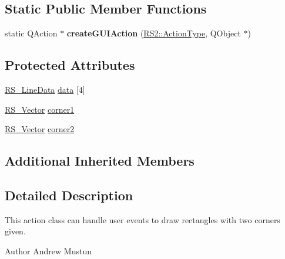 \subsection*{Static Public Member Functions}
\begin{DoxyCompactItemize}
\item 
\hypertarget{classRS__ActionDrawLineRectangle_a43f47faa3d48f2249db20c22d4e6551b}{static Q\-Action $\ast$ {\bfseries create\-G\-U\-I\-Action} (\hyperlink{classRS2_afe3523e0bc41fd637b892321cfc4b9d7}{R\-S2\-::\-Action\-Type}, Q\-Object $\ast$)}\label{classRS__ActionDrawLineRectangle_a43f47faa3d48f2249db20c22d4e6551b}

\end{DoxyCompactItemize}
\subsection*{Protected Attributes}
\begin{DoxyCompactItemize}
\item 
\hyperlink{classRS__LineData}{R\-S\-\_\-\-Line\-Data} \hyperlink{classRS__ActionDrawLineRectangle_a723761bc55877717efebafbc7969aff9}{data} \mbox{[}4\mbox{]}
\item 
\hyperlink{classRS__Vector}{R\-S\-\_\-\-Vector} \hyperlink{classRS__ActionDrawLineRectangle_a01c8a7aa17832e4822c40ce96436414b}{corner1}
\item 
\hyperlink{classRS__Vector}{R\-S\-\_\-\-Vector} \hyperlink{classRS__ActionDrawLineRectangle_a8747329fd78c9fd9a396aad092138be7}{corner2}
\end{DoxyCompactItemize}
\subsection*{Additional Inherited Members}


\subsection{Detailed Description}
This action class can handle user events to draw rectangles with two corners given.

\begin{DoxyAuthor}{Author}
Andrew Mustun 
\end{DoxyAuthor}


